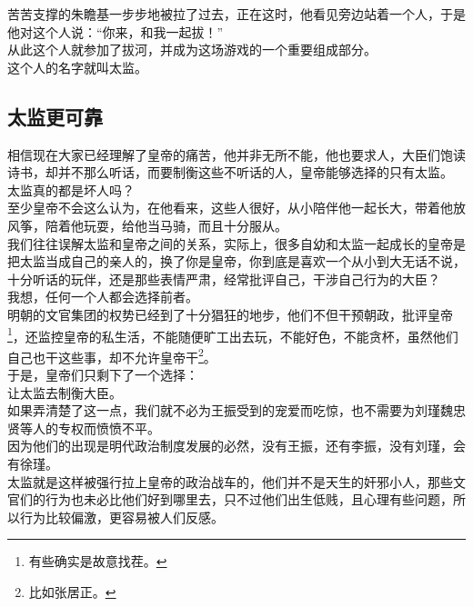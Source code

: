 \begin{multicols}{\theparacolNo}
苦苦支撑的朱瞻基一步步地被拉了过去，正在这时，他看见旁边站着一个人，于是他对这个人说：“你来，和我一起拔！”\\

从此这个人就参加了拔河，并成为这场游戏的一个重要组成部分。\\

这个人的名字就叫太监。\\

\subsection{太监更可靠}
相信现在大家已经理解了皇帝的痛苦，他并非无所不能，他也要求人，大臣们饱读诗书，却并不那么听话，而要制衡这些不听话的人，皇帝能够选择的只有太监。\\

太监真的都是坏人吗？\\

至少皇帝不会这么认为，在他看来，这些人很好，从小陪伴他一起长大，带着他放风筝，陪着他玩耍，给他当马骑，而且十分服从。\\

我们往往误解太监和皇帝之间的关系，实际上，很多自幼和太监一起成长的皇帝是把太监当成自己的亲人的，换了你是皇帝，你到底是喜欢一个从小到大无话不说，十分听话的玩伴，还是那些表情严肃，经常批评自己，干涉自己行为的大臣？\\

我想，任何一个人都会选择前者。\\

明朝的文官集团的权势已经到了十分猖狂的地步，他们不但干预朝政，批评皇帝\footnote{有些确实是故意找茬。}，还监控皇帝的私生活，不能随便旷工出去玩，不能好色，不能贪杯，虽然他们自己也干这些事，却不允许皇帝干\footnote{比如张居正。}。\\

于是，皇帝们只剩下了一个选择：\\

让太监去制衡大臣。\\

如果弄清楚了这一点，我们就不必为王振受到的宠爱而吃惊，也不需要为刘瑾魏忠贤等人的专权而愤愤不平。\\

因为他们的出现是明代政治制度发展的必然，没有王振，还有李振，没有刘瑾，会有徐瑾。\\

太监就是这样被强行拉上皇帝的政治战车的，他们并不是天生的奸邪小人，那些文官们的行为也未必比他们好到哪里去，只不过他们出生低贱，且心理有些问题，所以行为比较偏激，更容易被人们反感。\\


\end{multicols}
